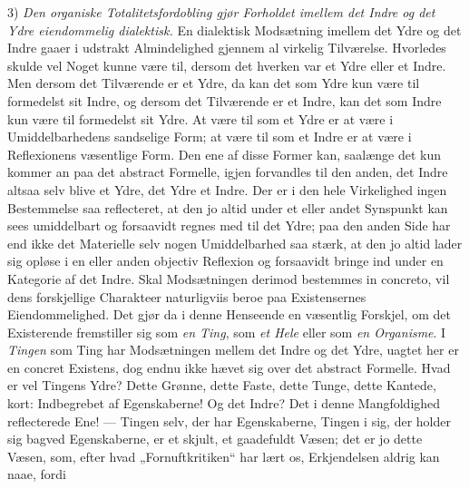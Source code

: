 \documentclass[12pt,a4paper]{book}
\begin{document}
3) \emph{Den organiske Totalitetsfordobling gjør Forholdet imellem det
Indre og det Ydre eiendommelig dialektisk.}
En dialektisk Modsætning imellem det Ydre og det Indre gaaer i udstrakt
Almindelighed gjennem al virkelig Tilværelse. Hvorledes skulde vel Noget
kunne være til, dersom det hverken var et Ydre eller et Indre. Men
dersom det Tilværende er et Ydre, da kan det som Ydre kun være til
formedelst sit Indre, og dersom det Tilværende er et Indre, kan det som
Indre kun være til formedelst sit Ydre. At være til som et Ydre er at
være i Umiddelbarhedens sandselige Form; at være til som et Indre er at
være i Reflexionens væsentlige Form. Den ene af disse Former kan,
saalænge det kun kommer an paa det abstract Formelle, igjen forvandles
til den anden, det Indre altsaa selv blive et Ydre, det Ydre et Indre.
Der er i den hele Virkelighed ingen Bestemmelse saa reflecteret, at den
jo altid under et eller andet Synspunkt kan sees umiddelbart og
forsaavidt regnes med til det Ydre; paa den anden Side har end ikke det
Materielle selv nogen Umiddelbarhed saa stærk, at den jo altid lader sig
opløse i en eller anden objectiv Reflexion og forsaavidt bringe ind
under en Kategorie af det Indre. Skal Modsætningen derimod bestemmes in
concreto, vil dens forskjellige Charakteer naturligviis beroe paa
Existensernes Eiendommelighed. Det gjør da i denne Henseende en
væsentlig Forskjel, om det Existerende fremstiller sig som \emph{en Ting}, som
\emph{et Hele} eller som \emph{en Organisme}.
I \emph{Tingen} som Ting har Modsætningen mellem det Indre og det Ydre, uagtet
her er en concret Existens, dog endnu ikke hævet sig over det abstract
Formelle. Hvad er vel Tingens Ydre? Dette Grønne, dette Faste, dette
Tunge, dette Kantede, kort: Indbegrebet af Egenskaberne! Og det Indre?
Det i denne Mangfoldighed reflecterede Ene! --- Tingen selv, der har
Egenskaberne, Tingen i sig, der holder sig bagved Egenskaberne, er et
skjult, et gaadefuldt Væsen; det er jo dette Væsen, som, efter hvad
„Fornuftkritiken“ har lært os, Erkjendelsen aldrig kan naae, fordi
\end{document}
